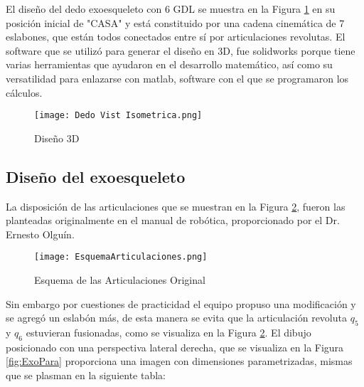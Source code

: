 \noindent El diseño del dedo exoesqueleto con 6 GDL se muestra en la Figura \ref{fig:3DModel} en su posición inicial de
"CASA" y está constituido por una cadena cinemática de 7 eslabones, que están todos conectados entre sí por articulaciones
revolutas. El software que se utilizó para generar el diseño en 3D, fue solidworks porque tiene varias herramientas que
ayudaron en el desarrollo matemático, así como su versatilidad para enlazarse con matlab, software con el que se
programaron los cálculos.  
\begin{figure}[H]
    \centering
    \texttt{[image: Dedo Vist Isometrica.png]} 
    \caption{Diseño 3D}
    \label{fig:3DModel}
\end{figure}

\subsection{Diseño del exoesqueleto}
\noindent La disposición de las articulaciones que se muestran en la Figura \ref{fig:EsqArtOri}, fueron las planteadas
originalmente en el manual de robótica, proporcionado por el Dr. Ernesto Olguín.

\begin{figure}[H]
    \centering
    \texttt{[image: EsquemaArticulaciones.png]} 
    \caption{Esquema de las Articulaciones Original}
    \label{fig:EsqArtOri}
\end{figure}
\noindent Sin embargo por cuestiones de practicidad el equipo propuso una modificación y se agregó un eslabón más, de
esta manera se evita que la articulación revoluta  $q_5$ y  $q_6$ estuvieran fusionadas, como se visualiza en la 
Figura \ref{fig:EsqArtOri}. El dibujo posicionado con una perspectiva lateral derecha, que se visualiza en la Figura 
\ref{fig:ExoPara} proporciona una imagen con dimensiones parametrizadas, mismas que se plasman en la siguiente tabla: 

